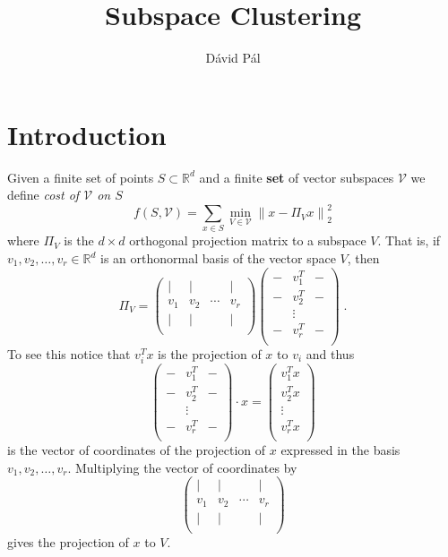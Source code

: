 \documentclass{article}
\newcommand{\R}{\mathbb{R}}
\newcommand{\V}{\mathcal{V}}
\newcommand{\norm}[1]{\left\|#1\right\|}
\begin{document}
\title{Subspace Clustering}
\author{D\'avid P\'al}
\maketitle

\section{Introduction}

Given a finite set of points $S \subset \R^d$ and a finite \textbf{set} of
vector subspaces $\V$ we define \emph{cost of $\V$ on $S$}
$$
f(S, \V) = \sum_{x \in S} \min_{V \in \V} \norm{x - \Pi_V x}_2^2
$$
where $\Pi_V$ is the $d\times d$ orthogonal projection matrix to a subspace $V$.
That is, if $v_1, v_2, \dots, v_r \in \R^d$ is an orthonormal basis
of the vector space $V$, then
$$
\Pi_V =
\begin{pmatrix}
\vert & \vert &  & \vert \\
v_1 & v_2 & \cdots & v_r \\
\vert & \vert &  & \vert \\
\end{pmatrix}
\begin{pmatrix}
- & v_1^T & - \\
- & v_2^T & - \\
  & \vdots &  \\
- & v_r^T & - \\
\end{pmatrix} \; .
$$
To see this notice that $v_i^T x$ is the projection of $x$ to $v_i$
and thus
$$
\begin{pmatrix}
- & v_1^T & - \\
- & v_2^T & - \\
  & \vdots & \\
- & v_r^T & - \\
\end{pmatrix} \cdot x
=
\begin{pmatrix}
v_1^T x \\
v_2^T x \\
\vdots  \\
v_r^T x \\
\end{pmatrix}
$$
is the vector of coordinates of the projection of $x$ expressed in the basis $v_1, v_2, \dots, v_r$.
Multiplying the vector of coordinates by
$$
\begin{pmatrix}
\vert & \vert &  & \vert \\
v_1 & v_2 & \cdots & v_r \\
\vert & \vert &  & \vert \\
\end{pmatrix}
$$
gives the projection of $x$ to $V$.
\end{document}
